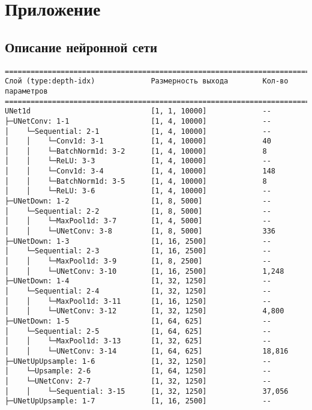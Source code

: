 \chapter*{Приложение}

\section*{Описание нейронной сети}
\begin{verbatim}
==============================================================================
Слой (type:depth-idx)             Размерность выхода        Кол-во параметров
==============================================================================
UNet1d                            [1, 1, 10000]             --
├─UNetConv: 1-1                   [1, 4, 10000]             --
│    └─Sequential: 2-1            [1, 4, 10000]             --
│    │    └─Conv1d: 3-1           [1, 4, 10000]             40
│    │    └─BatchNorm1d: 3-2      [1, 4, 10000]             8
│    │    └─ReLU: 3-3             [1, 4, 10000]             --
│    │    └─Conv1d: 3-4           [1, 4, 10000]             148
│    │    └─BatchNorm1d: 3-5      [1, 4, 10000]             8
│    │    └─ReLU: 3-6             [1, 4, 10000]             --
├─UNetDown: 1-2                   [1, 8, 5000]              --
│    └─Sequential: 2-2            [1, 8, 5000]              --
│    │    └─MaxPool1d: 3-7        [1, 4, 5000]              --
│    │    └─UNetConv: 3-8         [1, 8, 5000]              336
├─UNetDown: 1-3                   [1, 16, 2500]             --
│    └─Sequential: 2-3            [1, 16, 2500]             --
│    │    └─MaxPool1d: 3-9        [1, 8, 2500]              --
│    │    └─UNetConv: 3-10        [1, 16, 2500]             1,248
├─UNetDown: 1-4                   [1, 32, 1250]             --
│    └─Sequential: 2-4            [1, 32, 1250]             --
│    │    └─MaxPool1d: 3-11       [1, 16, 1250]             --
│    │    └─UNetConv: 3-12        [1, 32, 1250]             4,800
├─UNetDown: 1-5                   [1, 64, 625]              --
│    └─Sequential: 2-5            [1, 64, 625]              --
│    │    └─MaxPool1d: 3-13       [1, 32, 625]              --
│    │    └─UNetConv: 3-14        [1, 64, 625]              18,816
├─UNetUpUpsample: 1-6             [1, 32, 1250]             --
│    └─Upsample: 2-6              [1, 64, 1250]             --
│    └─UNetConv: 2-7              [1, 32, 1250]             --
│    │    └─Sequential: 3-15      [1, 32, 1250]             37,056
├─UNetUpUpsample: 1-7             [1, 16, 2500]             --

\end{verbatim}

